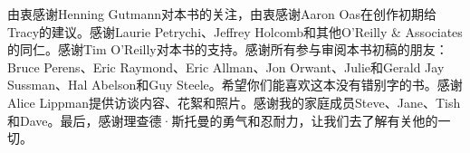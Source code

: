 \ifdefined\chs
由衷感谢Henning Gutmann对本书的关注，由衷感谢Aaron Oas在创作初期给Tracy的建议。感谢Laurie Petrychi、Jeffrey Holcomb和其他O’Reilly \& Associates的同仁。感谢Tim O’Reilly对本书的支持。感谢所有参与审阅本书初稿的朋友：Bruce Perens、Eric Raymond、Eric Allman、Jon Orwant、Julie和Gerald Jay Sussman、Hal Abelson和Guy Steele。希望你们能喜欢这本没有错别字的书。感谢Alice Lippman提供访谈内容、花絮和照片。感谢我的家庭成员Steve、Jane、Tish和Dave。最后，感谢理查德·斯托曼的勇气和忍耐力，让我们去了解有关他的一切。

\bigskip
{}
\fi

